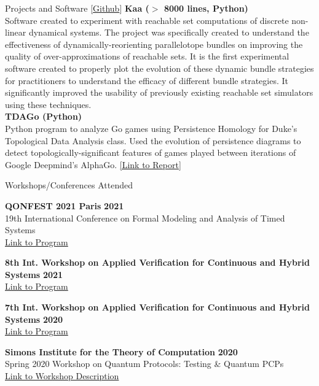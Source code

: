 \documentclass{resume} %
\begin{document}
\begin{rSection}{Projects and Software [\href{https://github.com/ekim1919}{Github}]}
    {\bf Kaa ($>$ 8000 lines, Python)} \\
    Software created to experiment with reachable set computations of discrete non-linear dynamical systems. The project was specifically created to understand the effectiveness of dynamically-reorienting parallelotope bundles on improving the quality of over-approximations of reachable sets. It is the first experimental software created to properly plot the evolution of these dynamic bundle strategies for practitioners to understand the efficacy of different bundle strategies. It significantly improved the usability of previously existing reachable set simulators using these techniques. \\

    {\bf TDAGo (Python)} \\
    Python program to analyze Go games using Persistence Homology for Duke's Topological Data Analysis class. Used the evolution of persistence diagrams to detect topologically-significant features of games played between iterations of Google Deepmind's AlphaGo. \newline
    \href{https://github.com/ekim1919/TDAGo/blob/master/paper/final.pdf}{ [Link to Report] }
\end{rSection}

\begin{rSection}{Workshops/Conferences Attended}

{\bf QONFEST 2021 Paris } \hfill {\bf 2021} \\
19th International Conference on Formal Modeling and Analysis of Timed Systems \\
\href{https://qonfest2021.lacl.fr/formats21.php}{Link to Program}

{\bf  8th Int. Workshop on Applied Verification for Continuous and Hybrid Systems} \hfill {\bf 2021} \\
\href{https://cps-vo.org/group/ARCH/archive}{Link to Program}

{\bf  7th Int. Workshop on Applied Verification for Continuous and Hybrid Systems} \hfill {\bf 2020} \\
\href{https://cps-vo.org/group/ARCH/archive}{Link to Program}

{\bf Simons Institute for the Theory of Computation} \hfill {\bf 2020} \\
Spring 2020 Workshop on Quantum Protocols: Testing \& Quantum PCPs \\
\href{https://simons.berkeley.edu/workshops/quantum-2020-2}{Link to Workshop Description}
\end{rSection}
\end{document}
